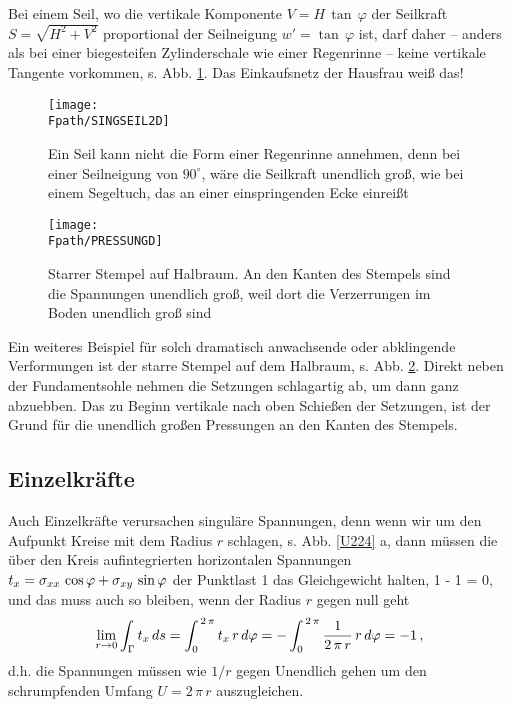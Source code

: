 {{Bei einem Seil, wo die vertikale Komponente $V = H\,\tan \,\varphi $ der Seilkraft $S = \sqrt{H^2 + V^2}$ proportional der Seilneigung $w' = \tan\,\varphi $ ist, darf daher -- anders als bei einer biegesteifen Zylinderschale wie einer Regenrinne -- keine vertikale Tangente vorkommen, s. Abb. \ref{Singseil14}. Das Einkaufsnetz der Hausfrau wei{\ss} das!

\begin{figure}[tbp] \centering
\if {} \sidecaption \fi
\texttt{[image: \\Fpath/SINGSEIL2D]}
\caption{Ein Seil kann nicht die Form einer Regenrinne annehmen, denn bei einer
Seilneigung von $90^\circ$, w\"{a}re die Seilkraft unendlich gro{\ss}, wie bei einem Segeltuch,
das an einer einspringenden Ecke einrei{\ss}t} \label{Singseil14}
\end{figure}%

\begin{figure}[tbp] \centering
\if {} \sidecaption \fi
\texttt{[image: \\Fpath/PRESSUNGD]}
\caption{Starrer Stempel auf Halbraum. An den Kanten des Stempels sind die Spannungen
unendlich gro{\ss}, weil dort die Verzerrungen im Boden unendlich gro{\ss} sind} \label{Pressung}
\end{figure}%

Ein weiteres Beispiel f\"{u}r solch dramatisch anwachsende oder abklingende Verformungen ist der starre Stempel auf dem Halbraum, s. Abb. \ref{Pressung}. Direkt neben der Fundamentsohle nehmen die Setzungen schlagartig ab, um dann ganz abzuebben. Das zu Beginn vertikale nach oben Schie{\ss}en der Setzungen, ist der Grund f\"{u}r die unendlich gro{\ss}en Pressungen an den Kanten des Stempels.


{\textcolor{sectionTitleBlue}{\subsection{Einzelkr\"{a}fte}}}


Auch Einzelkr\"{a}fte verursachen singul\"{a}re Spannungen, denn wenn wir um den Aufpunkt Kreise mit dem Radius $r $ schlagen, s. Abb. \ref{U224} a, dann m\"{u}ssen die \"{u}ber den Kreis aufintegrierten horizontalen Spannungen $t_x = \sigma_{xx}\,\cos \varphi + \sigma_{xy}\,\sin \varphi$ der Punktlast 1 das Gleichgewicht halten, 1 - 1 = 0, und das muss auch so bleiben, wenn der Radius $r $ gegen null geht
\begin{align}
\lim_{r \to 0} \int_{\Gamma}t_x\,ds = \int_0^{\,2\,\pi} t_x\,r\,d\varphi = -\int_0^{\,2\,\pi}\frac{1}{2\,\pi\,r}\,r\,d\varphi = -1\,,
\end{align}
d.h. die Spannungen m\"{u}ssen wie $1/r$ gegen Unendlich gehen um den schrumpfenden Umfang $U = 2\,\pi\,r$ auszugleichen.

}}
